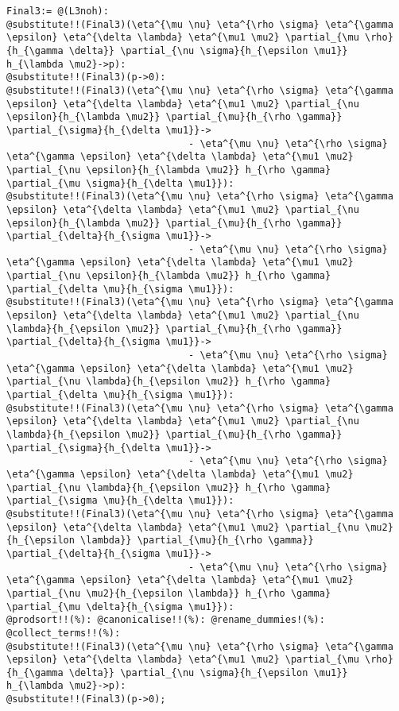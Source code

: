 \documentclass[11pt]{article}
\begin{document}
{\color[named]{Blue}\begin{verbatim}
Final3:= @(L3noh):
@substitute!!(Final3)(\eta^{\mu \nu} \eta^{\rho \sigma} \eta^{\gamma \epsilon} \eta^{\delta \lambda} \eta^{\mu1 \mu2} \partial_{\mu \rho}{h_{\gamma \delta}} \partial_{\nu \sigma}{h_{\epsilon \mu1}} h_{\lambda \mu2}->p):
@substitute!!(Final3)(p->0):
@substitute!!(Final3)(\eta^{\mu \nu} \eta^{\rho \sigma} \eta^{\gamma \epsilon} \eta^{\delta \lambda} \eta^{\mu1 \mu2} \partial_{\nu \epsilon}{h_{\lambda \mu2}} \partial_{\mu}{h_{\rho \gamma}} \partial_{\sigma}{h_{\delta \mu1}}->
                                - \eta^{\mu \nu} \eta^{\rho \sigma} \eta^{\gamma \epsilon} \eta^{\delta \lambda} \eta^{\mu1 \mu2} \partial_{\nu \epsilon}{h_{\lambda \mu2}} h_{\rho \gamma} \partial_{\mu \sigma}{h_{\delta \mu1}}):
@substitute!!(Final3)(\eta^{\mu \nu} \eta^{\rho \sigma} \eta^{\gamma \epsilon} \eta^{\delta \lambda} \eta^{\mu1 \mu2} \partial_{\nu \epsilon}{h_{\lambda \mu2}} \partial_{\mu}{h_{\rho \gamma}} \partial_{\delta}{h_{\sigma \mu1}}->
                                - \eta^{\mu \nu} \eta^{\rho \sigma} \eta^{\gamma \epsilon} \eta^{\delta \lambda} \eta^{\mu1 \mu2} \partial_{\nu \epsilon}{h_{\lambda \mu2}} h_{\rho \gamma} \partial_{\delta \mu}{h_{\sigma \mu1}}):
@substitute!!(Final3)(\eta^{\mu \nu} \eta^{\rho \sigma} \eta^{\gamma \epsilon} \eta^{\delta \lambda} \eta^{\mu1 \mu2} \partial_{\nu \lambda}{h_{\epsilon \mu2}} \partial_{\mu}{h_{\rho \gamma}} \partial_{\delta}{h_{\sigma \mu1}}->
                                - \eta^{\mu \nu} \eta^{\rho \sigma} \eta^{\gamma \epsilon} \eta^{\delta \lambda} \eta^{\mu1 \mu2} \partial_{\nu \lambda}{h_{\epsilon \mu2}} h_{\rho \gamma} \partial_{\delta \mu}{h_{\sigma \mu1}}):
@substitute!!(Final3)(\eta^{\mu \nu} \eta^{\rho \sigma} \eta^{\gamma \epsilon} \eta^{\delta \lambda} \eta^{\mu1 \mu2} \partial_{\nu \lambda}{h_{\epsilon \mu2}} \partial_{\mu}{h_{\rho \gamma}} \partial_{\sigma}{h_{\delta \mu1}}->
                                - \eta^{\mu \nu} \eta^{\rho \sigma} \eta^{\gamma \epsilon} \eta^{\delta \lambda} \eta^{\mu1 \mu2} \partial_{\nu \lambda}{h_{\epsilon \mu2}} h_{\rho \gamma} \partial_{\sigma \mu}{h_{\delta \mu1}}):
@substitute!!(Final3)(\eta^{\mu \nu} \eta^{\rho \sigma} \eta^{\gamma \epsilon} \eta^{\delta \lambda} \eta^{\mu1 \mu2} \partial_{\nu \mu2}{h_{\epsilon \lambda}} \partial_{\mu}{h_{\rho \gamma}} \partial_{\delta}{h_{\sigma \mu1}}->
                                - \eta^{\mu \nu} \eta^{\rho \sigma} \eta^{\gamma \epsilon} \eta^{\delta \lambda} \eta^{\mu1 \mu2} \partial_{\nu \mu2}{h_{\epsilon \lambda}} h_{\rho \gamma} \partial_{\mu \delta}{h_{\sigma \mu1}}):
@prodsort!!(%): @canonicalise!!(%): @rename_dummies!(%): @collect_terms!!(%):
@substitute!!(Final3)(\eta^{\mu \nu} \eta^{\rho \sigma} \eta^{\gamma \epsilon} \eta^{\delta \lambda} \eta^{\mu1 \mu2} \partial_{\mu \rho}{h_{\gamma \delta}} \partial_{\nu \sigma}{h_{\epsilon \mu1}} h_{\lambda \mu2}->p):
@substitute!!(Final3)(p->0);
\end{verbatim}}
\end{document}
